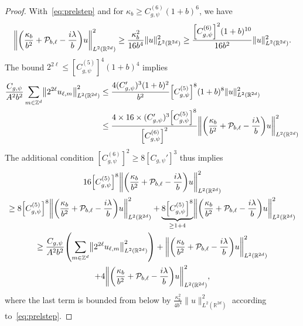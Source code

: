 \documentclass[AHL,Unicode,longabstracts]{cedram}
\newcommand{\Z}{\mathbb{Z}}
\newcommand{\R}{\mathbb{R}}
\newcommand{\clP}{\mathcal{P}}
\let\originalleft\left
\let\originalright\right
\renewcommand{\left}{\mathopen{}\mathclose\bgroup\originalleft}
\renewcommand{\right}{\aftergroup\egroup\originalright}
\newcounter{setofstep}
\newcounter{step}[setofstep]
\begin{document}
\begin{proof}
With~\eqref{eq:prelstep} and for $\kappa_{b}\geq C_{g,\psi}^{(6)}(1+b)^{6}$, we have
\[
\left\|\left(\frac{\kappa_{b}}{b^{2}}+\clP_{b,\ell}-\frac{i\lambda}{b}\right)u\right\|_{L^{2}(\R^{2d})}^{2}\geq \frac{\kappa_{b}^{2}}{16 b^{4}}\|u\|_{L^{2}(\R^{2d})}^{2}\geq \frac{\left[C_{g,\psi}^{(6)}\right]^{2}(1+b)^{10}}{16b^{2}}\|u\|_{L^{2}(\R^{2d})}^{2}.
\]
The bound $2^{2\ell}\leq [C_{g,\psi}^{(5)}]^{4}(1+b)^{4}$ implies
\begin{align*}
\frac{C_{g,\psi}}{A^{2}b^{2}}\sum_{m\in\Z^{d}}\left\|2^{2\ell}u_{\ell,m}\right\|^{2}_{L^{2}(\R^{2d})}&\leq \frac{4(C_{g,\psi}')^{3}(1+b)^{2}}{b^{2}}\left[C_{g,\psi}^{(5)}\right]^{8}(1+b)^{8}\|u\|^{2}_{L^{2}(\R^{2d})}\,\\
&\leq \frac{4\times 16 \times(C'_{g,\psi})^{3}\left[C_{g,\psi}^{(5)}\right]^{8}}{\left[C_{g,\psi}^{(6)}\right]^{2}}\left\|\left(\frac{\kappa_{b}}{b^{2}}+\clP_{b,\ell}-\frac{i\lambda}{b}\right)u\right\|_{L^{2}(\R^{2d})}^{2}
\end{align*}
The additional condition $[C_{g,\psi}^{(6)}]^{2}\geq 8[C_{g,\psi}']^{3}$ thus implies
\begin{multline*}
16 \left[C_{g,\psi}^{(5)}\right]^{8} \left\| \left(\frac{\kappa_{b}}{b^{2}}+\clP_{b,\ell} - \frac{i\lambda}{b}\right) u \right\|^{2}_{L^2(\R^{2d})}
\\
\geq 8 \left[C_{g,\psi}^{(5)}\right]^{8} \left\| \left(\frac{\kappa_{b}}{b^{2}}+\clP_{b,\ell} - \frac{i\lambda}{b}\right) u \right\|^{2}_{L^2(\R^{2d})} +\underbrace{8\left[C_{g,\psi}^{(5)}\right]^{8}}_{\geq 1+4} \left\|\left(\frac{\kappa_{b}}{b^{2}}+\clP_{b,\ell} - \frac{i\lambda}{b}\right) u \right\|^{2}_{L^2(\R^{2d})}
\\
\geq \frac{C_{g,\psi}}{A^{2}b^{2}}\left(\sum_{m\in\Z^{d}}\left\|2^{2\ell}u_{\ell,m}\right\|^{2}_{L^{2}(\R^{2d})}\right) +\left\| \left(\frac{\kappa_{b}}{b^{2}}+\clP_{b,\ell} - \frac{i\lambda}{b}\right) u \right\|^{2}_{L^2(\R^{2d})}
\\+4\left\|\left(\frac{\kappa_{b}}{b^{2}}+\clP_{b,\ell} - \frac{i\lambda}{b}\right) u\right\|^{2}_{L^2(\R^{2d})},
\end{multline*}
where the last term is bounded from below by $ \frac{\kappa_{b}^{2}}{4b^{4}}\|u\|^{2}_{L^{2}(\R^{2d})}$ according to~\eqref{eq:prelstep}.


\end{proof}
\end{document}
